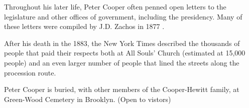 \documentclass{article}
\begin{document}
\begin{minipage}[t]{0.46\linewidth}
\begin{enumList}
\item Throughout his later life, Peter Cooper often penned open letters to the
legislature and other offices of government, including the presidency. Many of
these letters were compiled by J.D. Zachos in 1877 \cite{opinions}.

\item After his death in the 1883, the New York Times described the
{ thousands of people that paid their respects} both at
All Souls' Church (estimated at 15,000 people) and an even larger number of
people that lined the streets along the procession route.

\item Peter Cooper is buried, with other members of the Cooper-Hewitt family,
at { Green-Wood Cemetery} in Brooklyn. (Open to vistors)


\setcounter{enumTemp}{\value{enumListi}}
\end{enumList}
\end{minipage}\hfill
\end{document}
